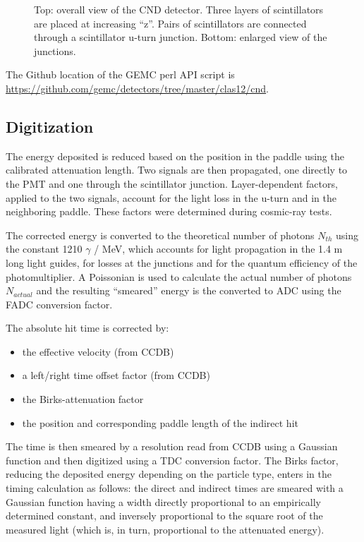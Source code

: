 \begin{figure}
	\caption{Top: overall view of the CND detector. Three layers of scintillators are placed at increasing ``z''. Pairs of scintillators
            are connected through a scintillator u-turn junction. Bottom: enlarged view of the junctions. }
	\label{fig:cndGeometry}
\end{figure}

The Github location of the GEMC perl API script is \url{https://github.com/gemc/detectors/tree/master/clas12/cnd}.

\subsection{Digitization}


The energy deposited is reduced based on the position in the paddle using the calibrated attenuation length.
Two signals are then propagated, one directly to the PMT and one through the scintillator junction.
Layer-dependent factors, applied to the two  signals, account for the light loss in the u-turn and in the neighboring paddle.
These factors were determined during cosmic-ray tests.

The corrected energy is converted to the theoretical number of photons $N_{th}$ using the constant 1210 $\gamma$ / MeV, which accounts for light
propagation in the 1.4 m long light guides, for losses at the junctions and for the quantum efficiency of the photomultiplier.
A Poissonian is used to
calculate the actual number of photons $N_{actual}$ and the resulting ``smeared'' energy is the converted to ADC using the FADC conversion factor.


The absolute hit time is corrected by:

\begin{itemize}
	\item the effective velocity (from CCDB)
	\item a left/right time offset factor (from CCDB)
	\item the Birks-attenuation factor
	\item the position and corresponding paddle length of the indirect hit
\end{itemize}

The time is then smeared by a resolution read from CCDB using a Gaussian function and then digitized using a TDC conversion factor.
The Birks factor, reducing the deposited
energy depending on the particle type, enters in the timing calculation as
follows: the direct and indirect times are smeared with a Gaussian
function having a width directly proportional to an empirically determined
constant, and inversely proportional to the square root of the measured
light (which is, in turn, proportional to the attenuated energy).



